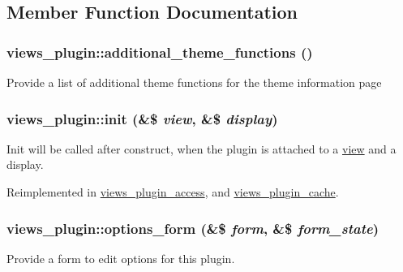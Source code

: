 \subsection{Member Function Documentation}
\hypertarget{classviews__plugin_5c5fb9783079362378d804c94b142b9f}{
\subsubsection[{additional\_\-theme\_\-functions}]{\setlength{\rightskip}{0pt plus 5cm}views\_\-plugin::additional\_\-theme\_\-functions ()}}
\label{classviews__plugin_5c5fb9783079362378d804c94b142b9f}


Provide a list of additional theme functions for the theme information page \hypertarget{classviews__plugin_d6545806f1390625286446b426f1a489}{
\subsubsection[{init}]{\setlength{\rightskip}{0pt plus 5cm}views\_\-plugin::init (\&\$ {\em view}, \/  \&\$ {\em display})}}
\label{classviews__plugin_d6545806f1390625286446b426f1a489}


Init will be called after construct, when the plugin is attached to a \hyperlink{classview}{view} and a display. 

Reimplemented in \hyperlink{classviews__plugin__access_1b295cea820f403d1e361e7de4e3800e}{views\_\-plugin\_\-access}, and \hyperlink{classviews__plugin__cache_6cecf3993f6314215559c6a914f8a96b}{views\_\-plugin\_\-cache}.\hypertarget{classviews__plugin_1aaed8da1afd9f45293a37358c159837}{
\subsubsection[{options\_\-form}]{\setlength{\rightskip}{0pt plus 5cm}views\_\-plugin::options\_\-form (\&\$ {\em form}, \/  \&\$ {\em form\_\-state})}}
\label{classviews__plugin_1aaed8da1afd9f45293a37358c159837}


Provide a form to edit options for this plugin. 

